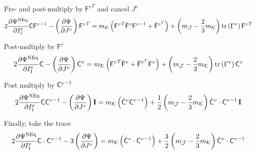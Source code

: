 \documentclass{beamer}
\def\myPsi{{\mathrm{\Psi}}}
\def\myF{{\mathsf{F}}}
\def\myC{{\bf\mathsf{C}}}
\begin{document}
    \begin{frame}
        \begin{block}{\footnotesize Pre- and post-multiply by ${\myF^v}^{T}$ and cancel $J^v$}
            \footnotesize\begin{align*}
                2\del{\myPsi^{\rm NEq}}{I^e_1}\myC{\myF^v}^{-1} -
                \left({\del{\myPsi}{J^v}}\right) {\myF^v}^{T} = m_\mathcal{K}
                \left(
                    {\myF^v}^T\dot{\mathsf{F}}^v {\mathsf{F}^v}^{-1}
                    +
                    {\dot{\mathsf{F}}}^{v^T}
                \right)+
                \lr{m_\mathcal{J}
                - \frac{2}{3}m_\mathcal{K}
                }\text{tr}\lr{\Gamma^v}{\mathsf{F}^v}^{T}
            \end{align*}
        \end{block}
        \begin{block}{\footnotesize Post-multiply by ${\myF^v}$}
            \footnotesize\begin{align*}
                2 \del{\myPsi^{\rm NEq}}{I^e_1}\myC -
                \left({\del{\myPsi}{J^v}}\right) {\myC^v}= m_\mathcal{K}
                \left(
                    {\myF^v}^T\dot{\mathsf{F}}^v
                    +
                    {\dot{\mathsf{F}}}^{v^T} {\mathsf{F}}^v
                \right)
                +
                \lr{m_\mathcal{J}
                - \frac{2}{3}m_\mathcal{K}
                }\text{tr}\lr{\Gamma^v}\myC^v
            \end{align*}
        \end{block}
        \begin{block}{\footnotesize Post multiply by ${\myC^v}^{-1}$}
            \footnotesize\begin{align*}
                2 \del{\myPsi^{\rm NEq}}{I^e_1}\myC{\myC^v}^{-1} -
                \left({\del{\myPsi}{J^v}}\right){\bf I}
                = m_\mathcal{K}
                \left(
                    \dot{\myC}^v{{\myC}^v}^{-1}
                \right) 
                + \frac{1}{2}
                \lr{m_\mathcal{J}
                - \frac{2}{3}m_\mathcal{K}
                }\dot{\myC}^v\cdot{{\myC}^v}^{-1}\,{\bf I}
            \end{align*}
        \end{block}
        \begin{block}{\footnotesize Finally, take the trace}
            \footnotesize\begin{align*}
                2 \del{\myPsi^{\rm NEq}}{I^e_1}\myC\cdot{\myC^v}^{-1} -
                3\left({\del{\myPsi}{J^v}}\right) 
                = m_\mathcal{K}
                \left(
                    \dot{\myC}^v\cdot{{\myC}^v}^{-1}
                \right) 
                + \frac{3}{2}
                \lr{m_\mathcal{J}
                - \frac{2}{3}m_\mathcal{K}
                }\dot{\myC}^v\cdot{{\myC}^v}^{-1}
            \end{align*}
        \end{block}
    \end{frame}
\end{document}
